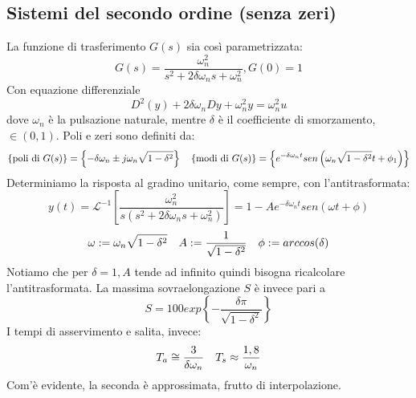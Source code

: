\documentclass[11pt]{article}
\begin{document}
\subsection{Sistemi del secondo ordine (senza zeri)}
La funzione di trasferimento $G(s)$ sia così parametrizzata:
\begin{displaymath}
    G(s)=\frac{\omega^2_n}{s^2+2\delta\omega_n s + \omega_n^2}, G(0)=1
\end{displaymath}
Con equazione differenziale
\begin{displaymath}
    D^2(y)+2\delta\omega_n Dy + \omega^2_n y = \omega_n^2 u
\end{displaymath}
dove $\omega_n$ è la pulsazione naturale, mentre $\delta$ è il coefficiente di smorzamento, $\in (0,1)$.
Poli e zeri sono definiti da:
\begin{displaymath}
    \left\{\textrm{poli di }G(s)\right\} = \left\{-\delta\omega_n \pm j\omega_n \sqrt{1-\delta^2}\right\} \hspace{10px}\left\{\textrm{modi di }G(s)\right\} = \left\{e^{-\delta\omega_nt}sen\left(\omega_n\sqrt{1-\delta^2}t+\phi_1\right)\right\}
\end{displaymath}
Determiniamo la risposta al gradino unitario, come sempre, con l'antitrasformata:
\begin{displaymath}
    y(t)=\mathcal{L}^{-1}\left[\frac{\omega_n^2}{s(s^2 + 2\delta\omega_n s+\omega_n^2)}\right] = 1-Ae^{-\delta\omega_nt} sen(\omega t + \phi)
\end{displaymath}
\begin{displaymath}
    \omega := \omega_n \sqrt{1-\delta^2}\hspace{10px}A:=\frac{1}{\sqrt{1-\delta^2}}\hspace{10px}\phi:=arccos(\delta)
\end{displaymath}
Notiamo che per $\delta=1, A$ tende ad infinito quindi bisogna ricalcolare l'antitrasformata. La massima sovraelongazione $S$ è invece pari a
\begin{displaymath}
    S = 100exp\left\{-\frac{\delta \pi}{\sqrt{1-\delta^2}}\right\}
\end{displaymath}
I tempi di asservimento e salita, invece:
\begin{displaymath}
    T_a \cong \frac{3}{\delta\omega_n}\hspace{10px}T_s \approx \frac{1,8}{\omega_n}
\end{displaymath}
Com'è evidente, la seconda è approssimata, frutto di interpolazione.
\end{document}
